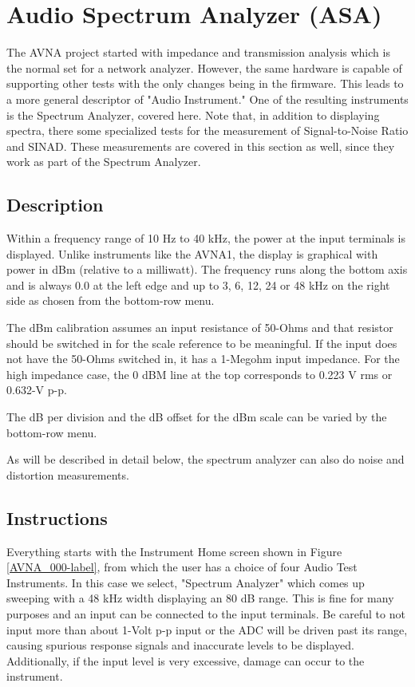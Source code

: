 \section{Audio Spectrum Analyzer (ASA)}
\label{sect:ASA}
The AVNA project started with impedance and transmission analysis which is the normal set for a network analyzer.  However, the same hardware is capable of supporting other tests with the only changes being in the firmware.  This leads to a more general descriptor of "Audio Instrument."  One of the resulting instruments is the Spectrum Analyzer, covered here.  Note that, in addition to displaying spectra,  there some specialized tests for the measurement of Signal-to-Noise Ratio and SINAD.  These measurements are covered in this section as well, since they work as part of the Spectrum Analyzer.
\subsection{Description}
\label{subsect:ASADescr}
Within a frequency range of 10 Hz to 40 kHz, the power at the  input terminals is displayed.  Unlike instruments like the AVNA1, the display is graphical with power in dBm (relative to a milliwatt).  The frequency runs along the bottom axis and is always 0.0 at the left edge and up to 3, 6, 12, 24 or 48 kHz on the right side as chosen from the bottom-row menu. 

The dBm calibration assumes an input resistance of 50-Ohms and that resistor should be switched in for the scale reference to be meaningful.  If the input does not have the 50-Ohms switched in, it has a 1-Megohm input impedance.  For the high impedance case, the 0 dBM line at the top corresponds to 0.223 V rms or 0.632-V p-p.

The dB per division and the dB offset for the dBm scale can be varied by the bottom-row menu.

As will be described in detail below, the spectrum analyzer can also do noise and  distortion measurements.

\subsection{Instructions}
\label{subsect:ASAInstr}
Everything starts with the Instrument Home screen shown in  Figure \ref{AVNA_000-label},  from which the user has a choice of four Audio Test Instruments. In this case we select, "\textsf{Spectrum Analyzer}"  which comes up sweeping with a 48 kHz width displaying an 80 dB range.   This is fine for many purposes and an input can be connected to the  input terminals.  Be careful to not input more than about 1-Volt p-p input or the ADC will be driven past its range, causing spurious response signals and inaccurate levels to be displayed.  Additionally, if the input level is very excessive,  damage can occur to the instrument.

